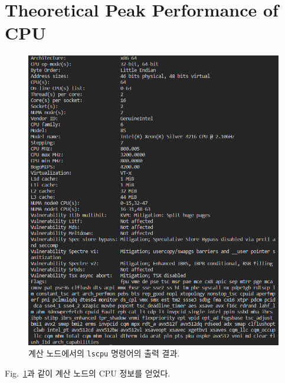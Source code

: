 \section{Theoretical Peak Performance of CPU}

\begin{figure}
    \centering
    \includegraphics[scale=0.8]{imgs/lscpu.png}
    \caption{\label{fig:lscpu}
        계산 노드에서의 \texttt{lscpu} 명령어의 출력 결과.
    }
\end{figure}

Fig.~{\ref{fig:lscpu}}과 같이 계산 노드의 CPU 정보를 얻었다.

